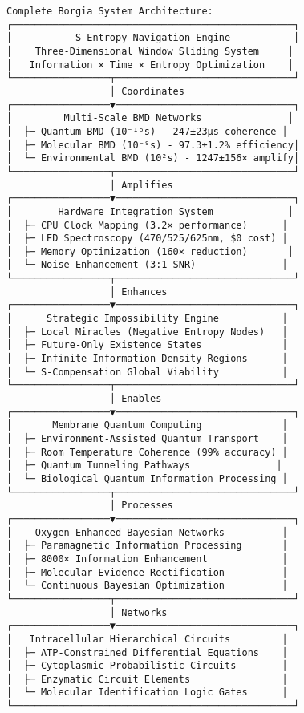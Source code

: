 \documentclass[11pt,a4paper]{article}
\begin{document}
\begin{verbatim}
Complete Borgia System Architecture:
┌─────────────────────────────────────────────────┐
│           S-Entropy Navigation Engine           │
│    Three-Dimensional Window Sliding System     │
│   Information × Time × Entropy Optimization    │
└─────────────────┬───────────────────────────────┘
                  │ Coordinates
┌─────────────────▼───────────────────────────────┐
│         Multi-Scale BMD Networks               │
│  ├─ Quantum BMD (10⁻¹⁵s) - 247±23μs coherence │
│  ├─ Molecular BMD (10⁻⁹s) - 97.3±1.2% efficiency│
│  └─ Environmental BMD (10²s) - 1247±156× amplify│
└─────────────────┬───────────────────────────────┘
                  │ Amplifies
┌─────────────────▼───────────────────────────────┐
│        Hardware Integration System             │
│  ├─ CPU Clock Mapping (3.2× performance)      │
│  ├─ LED Spectroscopy (470/525/625nm, $0 cost) │
│  ├─ Memory Optimization (160× reduction)       │
│  └─ Noise Enhancement (3:1 SNR)               │
└─────────────────┬───────────────────────────────┘
                  │ Enhances
┌─────────────────▼───────────────────────────────┐
│      Strategic Impossibility Engine           │
│  ├─ Local Miracles (Negative Entropy Nodes)   │
│  ├─ Future-Only Existence States              │
│  ├─ Infinite Information Density Regions      │
│  └─ S-Compensation Global Viability           │
└─────────────────┬───────────────────────────────┘
                  │ Enables
┌─────────────────▼───────────────────────────────┐
│       Membrane Quantum Computing              │
│  ├─ Environment-Assisted Quantum Transport    │
│  ├─ Room Temperature Coherence (99% accuracy) │
│  ├─ Quantum Tunneling Pathways               │
│  └─ Biological Quantum Information Processing │
└─────────────────┬───────────────────────────────┘
                  │ Processes
┌─────────────────▼───────────────────────────────┐
│    Oxygen-Enhanced Bayesian Networks          │
│  ├─ Paramagnetic Information Processing       │
│  ├─ 8000× Information Enhancement             │
│  ├─ Molecular Evidence Rectification          │
│  └─ Continuous Bayesian Optimization          │
└─────────────────┬───────────────────────────────┘
                  │ Networks
┌─────────────────▼───────────────────────────────┐
│   Intracellular Hierarchical Circuits         │
│  ├─ ATP-Constrained Differential Equations    │
│  ├─ Cytoplasmic Probabilistic Circuits        │
│  ├─ Enzymatic Circuit Elements                │
│  └─ Molecular Identification Logic Gates      │
└─────────────────────────────────────────────────┘
\end{verbatim}
\end{document}
